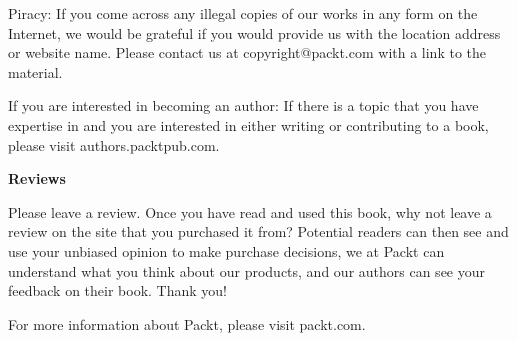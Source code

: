 Piracy: If you come across any illegal copies of our works in any form on the Internet, we would be grateful if you would provide us with the location address or website name. Please contact us at copyright@packt.com with a link to the material.\par

If you are interested in becoming an author: If there is a topic that you have expertise in and you are interested in either writing or contributing to a book, please visit authors.packtpub.com.\par

\hspace*{\fill} \par %
\textbf{Reviews}

Please leave a review. Once you have read and used this book, why not leave a review on the site that you purchased it from? Potential readers can then see and use your unbiased opinion to make purchase decisions, we at Packt can understand what you think about our products, and our authors can see your feedback on their book. Thank you!\par

For more information about Packt, please visit packt.com.\par

\newpage

















